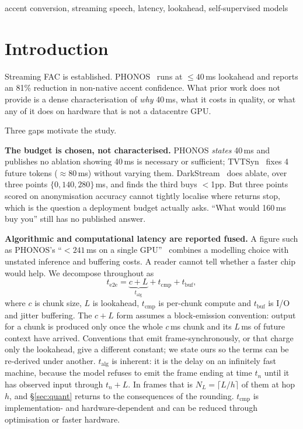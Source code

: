 \documentclass[journal]{IEEEtran}
\newcommand{\talg}{\ensuremath{t_{\mathrm{alg}}}}
\newcommand{\tcmp}{\ensuremath{t_{\mathrm{cmp}}}}
\newcommand{\tbuf}{\ensuremath{t_{\mathrm{buf}}}}
\begin{document}
\begin{IEEEkeywords}
accent conversion, streaming speech, latency, lookahead, self-supervised models
\end{IEEEkeywords}

\section{Introduction}

Streaming FAC is established. PHONOS~\cite{phonos2026} runs at
${\leq}40$\,ms lookahead and reports an 81\% reduction in non-native accent
confidence. What prior work does not provide is a dense characterisation of \emph{why} 40\,ms, what it
costs in quality, or what any of it does on hardware that is not a datacentre
GPU.

Three gaps motivate the study.

\textbf{The budget is chosen, not characterised.} PHONOS \emph{states} 40\,ms
and publishes no ablation showing 40\,ms is necessary or sufficient;
TVTSyn~\cite{tvtsyn2026} fixes 4 future tokens ($\approx$80\,ms) without
varying them. DarkStream~\cite{darkstream2025} does ablate, over three points
$\{0, 140, 280\}$\,ms, and finds the third buys
$<$1pp. But three points scored on anonymisation accuracy cannot tightly
localise where returns stop, which is the question a deployment budget actually asks.
``What would 160\,ms buy you'' still has no published answer.

\textbf{Algorithmic and computational latency are reported fused.} A figure
such as PHONOS's ``${<}241$\,ms on a single GPU''~\cite{phonos2026} combines a
modelling choice with
unstated inference and buffering costs. A reader cannot tell whether a faster
chip would help. We decompose throughout as
\begin{equation}
t_{\mathrm{e2e}} = \underbrace{c + L}_{t_{\mathrm{alg}}} + t_{\mathrm{cmp}} + t_{\mathrm{buf}},
\label{eq:decomp}
\end{equation}
where $c$ is chunk size, $L$ is lookahead, \tcmp{} is per-chunk compute and
\tbuf{} is I/O and jitter buffering. The $c{+}L$ form assumes a block-emission
convention: output for a chunk is produced only once the whole $c$\,ms chunk
and its $L$\,ms of future context have arrived. Conventions that emit
frame-synchronously, or that charge only the lookahead, give a different
constant; we state ours so the terms can be re-derived under another. \talg{} is inherent: it is the delay on an
infinitely fast machine, because the model refuses to emit the frame ending at
time $t_n$ until it has observed input through $t_n{+}L$. In frames that is
$N_L=\lceil L/h\rceil$ of them at hop $h$, and \S\ref{sec:quant} returns to the
consequences of the rounding. \tcmp{} is implementation- and hardware-dependent and can be
reduced through optimisation or faster hardware.
\end{document}
